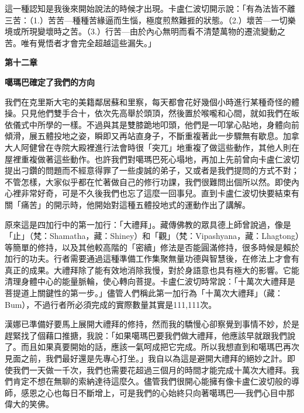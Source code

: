 這一種認知是我後來開始說法的時候才出現。卡盧仁波切開示說：「有為法皆不離三苦：（1.）苦苦---種種苦緣逼而生惱，極度煎熬難捱的狀態。（2.）壞苦---一切樂境或所現變壞時之苦。（3.）行苦---由於內心無明而看不清楚萬物的遷流變動之苦。唯有覺悟者才會完全超越這些漏失。」

\textbf{第十二章}

\textbf{噶瑪巴確定了我們的方向}

我們在克里斯大宅的美籍鄰居蘇和里察，每天都會花好幾個小時進行某種奇怪的體操。只見他們雙手合十，依次先高舉於頭頂，然後置於喉嚨和心間，就如我們在皈依儀式中所學的一樣。不過與其是雙膝跪地叩頭，他們是一叩掌心貼地，身體向前傾滑，展五體投地之姿，瞬即又再站直身子，不斷重複著此一步驟無有歇息。加拿大人阿健曾在寺院大殿裡進行法會時很「突兀」地重複了做這些動作，其他人則在屋裡重複做著這些動作。也許我們對噶瑪巴死心塌地，再加上先前曾向卡盧仁波切提出刁鑽的問題而不經意得罪了一些虔誠的弟子，又或者是我們提問的方式不對；不管怎樣，大家似乎都在忙著做自己的修行功課，我們很難問出個所以然。即使內心裡非常好奇，可是不久後我們也忘了這麼一回事兒。直到卡盧仁波切快要結束有關「痛苦」的開示時，他開始對這種五體投地式的運動作出了講解。

原來這是四加行中的第一加行：「大禮拜」。藏傳佛教的眾具德上師曾說過，像是「止」（梵：Shamatha，藏：Shiney）和「觀」（梵：Vipashyana，藏：Lhagtong）等簡單的修持，以及其他較高階的「密續」修法是否能圓滿修持，很多時候是賴於加行的功夫。行者需要通過這種準備工作集聚無量功德與智慧後，在修法上才會有真正的成果。大禮拜除了能有效地消除我慢，對於身語意也具有極大的影響。它能清理身體中心的能量脈輪，使心轉向菩提。卡盧仁波切時常說：「十萬次大禮拜是菩提道上關鍵性的第一步。」儘管人們稱此第一加行為「十萬次大禮拜」（藏：Bum），不過行者所必須完成的實際數量其實是111,111次。

漢娜已準備好要馬上展開大禮拜的修持，然而我的驕慢心卻察覺到事情不妙，於是趕緊找了個藉口推搪，我說：「如果噶瑪巴要我們做大禮拜，他應該早就跟我們說了。而且如果真要開始的話，應該一氣呵成把它完成。所以我想直到和噶瑪巴再次見面之前，我們最好還是先專心打坐。」我自以為這是避開大禮拜的絕妙之計。即使我們一天做一千次，我們也需要花超過三個月的時間才能完成十萬次大禮拜。我們肯定不想在無聊的索納達待這麼久。儘管我們很開心能擁有像卡盧仁波切般的導師，感恩之心也每日不斷增上，可是我們的心始終只向著噶瑪巴──我們心目中那偉大的笑佛。

